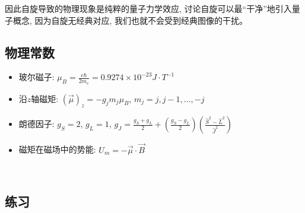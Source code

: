 因此自旋导致的物理现象是纯粹的量子力学效应,
讨论自旋可以最``干净''地引入量子概念, 因为自旋无经典对应,
我们也就不会受到经典图像的干扰。



\subsection*{物理常数}

\begin{itemize}
  \item 玻尔磁子: $\mu_B = \frac{e\hbar}{2m_e} = 0.9274 \times 10^{-23} J \cdot T^{-1}$
  \item 沿$z$轴磁矩: $\left( \vec \mu \right)_z = - g_j m_j \mu_B$,
  $m_j = j, j-1, ..., -j$
  \item 朗德因子: $g_S = 2$, $g_L =1$, $g_J =  \frac{g_S +
g_L}{2} + \left(\frac{g_S - g_L}{2} \right)\left(\frac{\hat S^2 -
\hat L^2}{\hat J^2} \right) $
  \item 磁矩在磁场中的势能: $U_m = -\vec \mu \cdot \vec B $
\end{itemize}


~~

\subsection*{练习}

